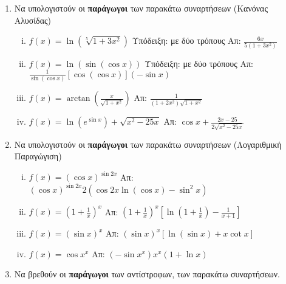 \documentclass[a4paper,table]{report}
\begin{document}
\begin{center}
  \minibox{\large \bfseries \textcolor{Col1}{Ασκήσεις στις Παραγώγους}}
\end{center}

\vspace{\baselineskip}

\begin{enumerate}

  \item Να υπολογιστούν οι \textbf{παράγωγοι} των παρακάτω συναρτήσεων
    \textcolor{Col1}{(Κανόνας Αλυσίδας})
    \begin{enumerate}[(i)]
      \item $ f(x) = \ln{(\sqrt[5]{1+3x^{2}})} $ \quad
        \textcolor{Col1}{Υπόδειξη:} με δύο τρόπους
        \hfill Απ: $ \frac{6x}{5(1+3x^{2})} $
      \item $ f(x) = \ln({\sin({\cos{x}})}) $ \quad 
        \textcolor{Col1}{Υπόδειξη:} με δύο τρόπους \hfill Απ: $
        \frac{1}{\sin{(\cos{x})}} [\cos{(\cos{x})}] (- \sin{x}) $ 
      \item $ f(x) = \arctan{\left(\frac{x}{\sqrt{1 + x^{2}}}\right)} $ \hfill Απ: $
        \frac{1}{(1+2x^{2})\sqrt{1 + x^{2}}} $
      \item $ f(x) = \ln{(e^{\sin{x}})} + \sqrt{x^{2} - 25x} $ \hfill Απ: $
        \cos{x} + \frac{2x - 25}{2 \sqrt{x^{2} - 25x}}  $  
    \end{enumerate}

  \item  Να υπολογιστούν οι \textbf{παράγωγοι} των παρακάτω συναρτήσεων
    \textcolor{Col1}{(Λογαριθμική Παραγώγιση})

    \begin{enumerate}[(i)]
      \item $ f(x) = (\cos{x})^{\sin{2x}} $ \hfill Απ: $
        (\cos{x})^{\sin{2x}} 2(\cos{2x} \ln{(\cos{x})} - \sin^{2}{x}) $
      \item $ f(x) = \left(1 + \frac{1}{x} \right)^{x} $ \hfill Απ: $
        \left(1 + \frac{1}{x}\right)^{x}\left[\ln{(1 + \frac{1}{x})} -
        \frac{1}{x+1}\right] $
      \item $ f(x)=(\sin{x})^{x} $ \hfill Απ: $ (\sin{x})^{x}[\ln{(\sin{x}
        )} + x \cot{x}] $ 
      \item $ f(x)=\cos{x}^{x} $ \hfill Απ: $ (- \sin{x^{x}})x^{x} (1 +
        \ln{x}) $
    \end{enumerate}

  \item Να βρεθούν οι \textbf{παράγωγοι} των \textcolor{Col1}{αντίστροφων,} των παρακάτω 
    συναρτήσεων.


\end{enumerate}
\end{document}
